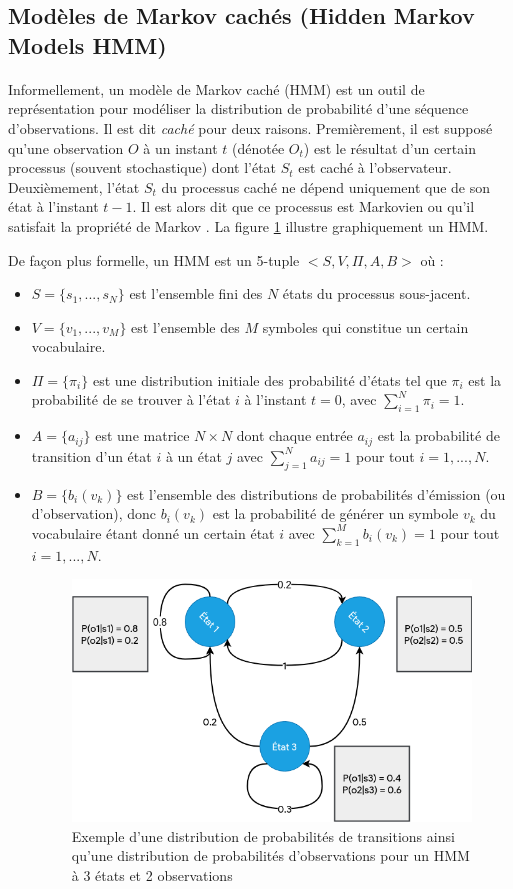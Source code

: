 \subsection{Modèles de Markov cachés (Hidden Markov Models HMM)}
\paragraph{}
Informellement, un modèle de Markov caché (HMM) est un outil de représentation pour modéliser la distribution de probabilité d'une séquence d'observations. Il est dit \textit{caché} pour deux raisons. Premièrement, il est supposé qu'une observation $O$ à un instant $t$ (dénotée $O_t$)  est le résultat d'un certain processus (souvent stochastique) dont l'état $S_t$ est caché à l'observateur. Deuxièmement, l'état $S_t$ du processus caché ne dépend uniquement que de son état à l'instant $t-1$. Il est alors dit que ce processus est Markovien ou qu'il satisfait la propriété de Markov \citep{hmm_intro,markov_process}. La figure \ref{fig:hmm_process} illustre graphiquement un HMM.
\par De façon plus formelle, un HMM est un 5-tuple $<S,V,\Pi,A,B>$ \citep{hmm_formal} où :
\begin{itemize}
	\item $S = \lbrace s_1,...,s_N \rbrace$ est l'ensemble fini des $N$ états du processus sous-jacent.
	\item $V = \lbrace v_1,...,v_M \rbrace$ est l'ensemble des $M$ symboles qui constitue un certain vocabulaire.
	\item $\Pi = \lbrace \pi_i \rbrace$ est une distribution initiale des probabilité d'états tel que $\pi_i$ est la probabilité de se trouver à l'état $i$ à l'instant $t=0$, avec $\sum_{i=1}^{N} \pi_i = 1$.
	\item $A=\lbrace a_{ij} \rbrace$ est une matrice $N \times N$ dont chaque entrée $a_{ij}$ est la probabilité de transition d'un état $i$ à un état $j$ avec $\sum_{j=1}^{N} a_{ij} = 1$ pour tout $i = 1,...,N$.
	\item $B=\lbrace b_i(v_k)\rbrace$ est l'ensemble des distributions de probabilités d'émission (ou d'observation), donc $b_i(v_k)$ est la probabilité de générer un symbole $v_k$ du vocabulaire étant donné un certain état $i$ avec $\sum_{k=1}^{M} b_{i}(v_k) = 1$ pour tout $i= 1,...,N$. 
	
	\begin{figure}[H]
		\centering
		\includegraphics[width=0.60\linewidth]{images/notions/hmm.png}
		\caption{Exemple d'une distribution de probabilités de transitions ainsi qu'une distribution de probabilités d'observations pour un HMM à 3 états et 2 observations}
		\label{fig:hmm_process}
	\end{figure}
\end{itemize}

